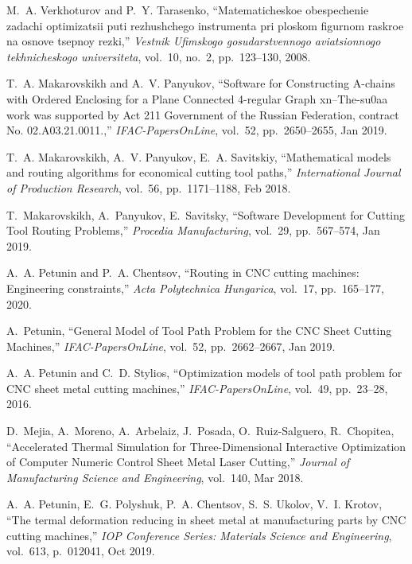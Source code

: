 \begin{thebibliography}{10}
M.~A. Verkhoturov and P.~Y. Tarasenko, ``Matematicheskoe obespechenie zadachi
  optimizatsii puti rezhushchego instrumenta pri ploskom figurnom raskroe na
  osnove tsepnoy rezki,'' {\em Vestnik Ufimskogo gosudarstvennogo aviatsionnogo
  tekhnicheskogo universiteta}, vol.~10, no.~2, pp.~123--130, 2008.

T.~A. Makarovskikh and A.~V. Panyukov, ``{Software for Constructing A-chains
  with Ordered Enclosing for a Plane Connected 4-regular Graph xn--The-su0aa
  work was supported by Act 211 Government of the Russian Federation, contract
  No. 02.A03.21.0011.},'' {\em IFAC-PapersOnLine}, vol.~52, pp.~2650--2655, Jan
  2019.

T.~A. Makarovskikh, A.~V. Panyukov, E.~A. Savitskiy, ``{Mathematical models
  and routing algorithms for economical cutting tool paths},'' {\em
  International Journal of Production Research}, vol.~56, pp.~1171--1188, Feb
  2018.

T.~Makarovskikh, A.~Panyukov, E.~Savitsky, ``{Software Development for
  Cutting Tool Routing Problems},'' {\em Procedia Manufacturing}, vol.~29,
  pp.~567--574, Jan 2019.

A.~A. Petunin and P.~A. Chentsov, ``Routing in {CNC} cutting machines:
  Engineering constraints,'' {\em Acta Polytechnica Hungarica}, vol.~17,
  pp.~165--177, 2020.

A.~Petunin, ``{General Model of Tool Path Problem for the {CNC} Sheet Cutting
  Machines},'' {\em IFAC-PapersOnLine}, vol.~52, pp.~2662--2667, Jan 2019.

A.~A. Petunin and C.~D. Stylios, ``Optimization models of tool path problem for
  {CNC} sheet metal cutting machines,'' {\em IFAC-PapersOnLine}, vol.~49,
  pp.~23--28, 2016.

D.~Mejia, A.~Moreno, A.~Arbelaiz, J.~Posada, O.~Ruiz-Salguero, R.~Chopitea,
  ``{Accelerated Thermal Simulation for Three-Dimensional Interactive
  Optimization of Computer Numeric Control Sheet Metal Laser Cutting},'' {\em
  Journal of Manufacturing Science and Engineering}, vol.~140, Mar 2018.

A.~A. Petunin, E.~G. Polyshuk, P.~A. Chentsov, S.~S. Ukolov, V.~I. Krotov,
  ``{The termal deformation reducing in sheet metal at manufacturing parts by
  {CNC} cutting machines},'' {\em IOP Conference Series: Materials Science and
  Engineering}, vol.~613, p.~012041, Oct 2019.


\end{thebibliography}

